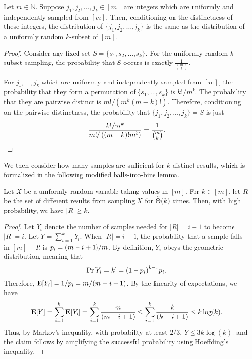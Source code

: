 \documentclass[11pt]{article}
\DeclarePairedDelimiter\rbra{\lparen}{\rparen}
\DeclarePairedDelimiter\sbra{\lbrack}{\rbrack}
\newcommand{\abs}[1]{\lvert #1 \rvert}
\newcommand{\paren}[1]{\left( #1 \right)}
\newcommand{\E}{\mathbf{E}}
\begin{document}
{\begin{proposition}\label{prop:sample-with-replace-for-without-replacement}
  Let $m\in \mathbb{N}$.
  Suppose $j_1, j_2, \dots, j_k \in [m]$ are integers which are uniformly and
  independently sampled from $[m]$.
  Then, conditioning on the distinctness of these integers, the distribution of
  $\{j_1, j_2, \dots, j_k\}$ is the same as the distribution of a uniformly
  random $k$-subset of $[m]$.
\end{proposition}

\begin{proof}
  Consider any fixed set $S = \{s_1, s_2, \dots, s_k\}$.
  For the uniformly random $k$-subset sampling, 
  the probability that $S$ occurs
  is exactly $\frac{1}{\binom{m}{k}}$.

  For $j_1, \dots, j_k$ 
  which are uniformly and independently 
  sampled from $[m]$, 
  the probability that they form a permutation of $\{s_1, \dots, s_k\}$
  is $k!/m^k$.
  The probability that they are pairwise distinct 
  is $m!/(m^k (m-k)!)$.
  Therefore, conditioning on the pairwise distinctness, 
  the probability that
  $\{j_1, j_2, \dots, j_k\} = S$ is just
  \[
    \frac{k!/m^k}{m!/\paren{(m-k)!m^k}} = \frac{1}{\binom{m}{k}}. \qedhere
  \]
\end{proof}

We then consider how many samples
are sufficient for $k$ distinct results,
which is formalized in the following
modified balls-into-bins lemma.
\begin{lemma}\label{lemma:balls-into-bins}
  Let $X$ be a uniformly random variable 
  taking values in $[m]$. 
  For $k\in [m]$,
  let $R$ be the set of different results from sampling $X$ for
  $\widetilde{\Theta} \rbra{k}$ times. 
  Then, with high probability,
  we have 
  $\abs{R} \ge k$.
\end{lemma}

\begin{proof}
  Let $Y_i$ denote the number of samples 
  needed for $\abs{R} = i-1$ to
  become $\abs{R} = i$. 
  Let $Y = \sum_{i=1}^{k} Y_i$.
  When $\abs{R} = i-1$, 
  the probability that a sample falls in
  $[m] - R$ is
  $ p_i = \rbra*{m-i+1}/m$.
  By definition, 
  $Y_i$ obeys the geometric distribution,
  meaning that
  \begin{equation*}
    \Pr \sbra*{Y_i = k} = {(1-p_i)}^{k-1}p_i.
  \end{equation*}
  Therefore, $\E [Y_i] = 1/p_i = m/\rbra{m-i+1}$.
  By the linearity of expectations, we have
  \begin{equation*}
    \E \sbra*{Y} 
    = \sum_{i=1}^{k} \E \sbra*{Y_i} 
    = \sum_{i=1}^{k} \frac{m}{\rbra*{m-i+1}} 
    \le \sum_{i=1}^k \frac{k}{\rbra*{k-i+1}}
    \le k\log (k).
  \end{equation*}
  Thus, by Markov's inequality, 
  with probability at least $2/3$,
  $Y\le 3k\log(k)$, 
  and the claim follows by
  amplifying the successful probability using
  Hoeffding's inequality.
\end{proof}

}
\end{document}
